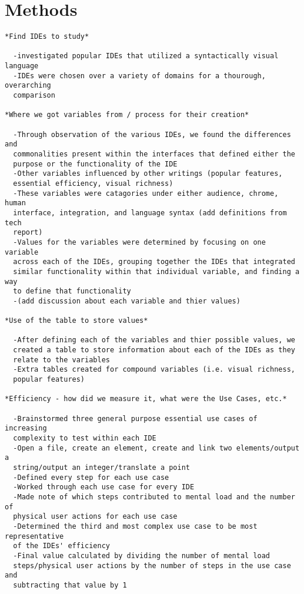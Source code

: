 \section{Methods}
\label{sec:methods}

\begin{verbatim}
*Find IDEs to study*

  -investigated popular IDEs that utilized a syntactically visual language
  -IDEs were chosen over a variety of domains for a thourough, overarching
  comparison

*Where we got variables from / process for their creation*

  -Through observation of the various IDEs, we found the differences and
  commonalities present within the interfaces that defined either the
  purpose or the functionality of the IDE
  -Other variables influenced by other writings (popular features,
  essential efficiency, visual richness)
  -These variables were catagories under either audience, chrome, human
  interface, integration, and language syntax (add definitions from tech
  report)
  -Values for the variables were determined by focusing on one variable
  across each of the IDEs, grouping together the IDEs that integrated
  similar functionality within that individual variable, and finding a way
  to define that functionality
  -(add discussion about each variable and thier values)

*Use of the table to store values*

  -After defining each of the variables and thier possible values, we
  created a table to store information about each of the IDEs as they
  relate to the variables
  -Extra tables created for compound variables (i.e. visual richness,
  popular features)

*Efficiency - how did we measure it, what were the Use Cases, etc.*

  -Brainstormed three general purpose essential use cases of increasing
  complexity to test within each IDE
  -Open a file, create an element, create and link two elements/output a
  string/output an integer/translate a point
  -Defined every step for each use case
  -Worked through each use case for every IDE
  -Made note of which steps contributed to mental load and the number of
  physical user actions for each use case
  -Determined the third and most complex use case to be most representative
  of the IDEs' efficiency
  -Final value calculated by dividing the number of mental load
  steps/physical user actions by the number of steps in the use case and
  subtracting that value by 1


\end{verbatim}

